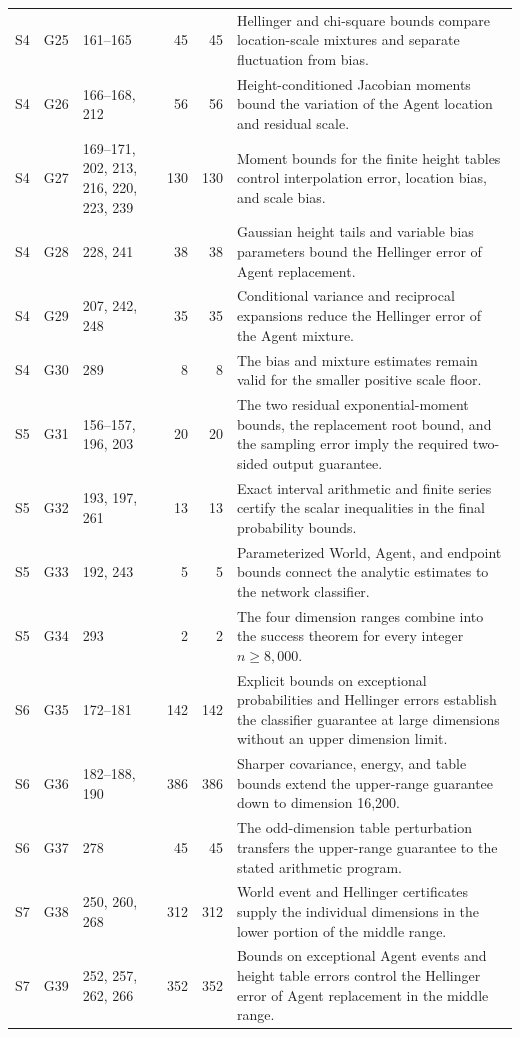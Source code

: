 \begin{longtable}{@{}l l p{} r r p{}@{}}
S4 & G25 & \raggedright 161--165 & 45 & 45 & \raggedright Hellinger and chi-square bounds compare location-scale mixtures and separate fluctuation from bias. \tabularnewline
S4 & G26 & \raggedright 166--168, 212 & 56 & 56 & \raggedright Height-conditioned Jacobian moments bound the variation of the Agent location and residual scale. \tabularnewline
S4 & G27 & \raggedright 169--171, 202, 213, 216, 220, 223, 239 & 130 & 130 & \raggedright Moment bounds for the finite height tables control interpolation error, location bias, and scale bias. \tabularnewline
S4 & G28 & \raggedright 228, 241 & 38 & 38 & \raggedright Gaussian height tails and variable bias parameters bound the Hellinger error of Agent replacement. \tabularnewline
S4 & G29 & \raggedright 207, 242, 248 & 35 & 35 & \raggedright Conditional variance and reciprocal expansions reduce the Hellinger error of the Agent mixture. \tabularnewline
S4 & G30 & \raggedright 289 & 8 & 8 & \raggedright The bias and mixture estimates remain valid for the smaller positive scale floor. \tabularnewline
S5 & G31 & \raggedright 156--157, 196, 203 & 20 & 20 & \raggedright The two residual exponential-moment bounds, the replacement root bound, and the sampling error imply the required two-sided output guarantee. \tabularnewline
S5 & G32 & \raggedright 193, 197, 261 & 13 & 13 & \raggedright Exact interval arithmetic and finite series certify the scalar inequalities in the final probability bounds. \tabularnewline
S5 & G33 & \raggedright 192, 243 & 5 & 5 & \raggedright Parameterized World, Agent, and endpoint bounds connect the analytic estimates to the network classifier. \tabularnewline
S5 & G34 & \raggedright 293 & 2 & 2 & \raggedright The four dimension ranges combine into the success theorem for every integer $n\ge8{,}000$. \tabularnewline
S6 & G35 & \raggedright 172--181 & 142 & 142 & \raggedright Explicit bounds on exceptional probabilities and Hellinger errors establish the classifier guarantee at large dimensions without an upper dimension limit. \tabularnewline
S6 & G36 & \raggedright 182--188, 190 & 386 & 386 & \raggedright Sharper covariance, energy, and table bounds extend the upper-range guarantee down to dimension 16{,}200. \tabularnewline
S6 & G37 & \raggedright 278 & 45 & 45 & \raggedright The odd-dimension table perturbation transfers the upper-range guarantee to the stated arithmetic program. \tabularnewline
S7 & G38 & \raggedright 250, 260, 268 & 312 & 312 & \raggedright World event and Hellinger certificates supply the individual dimensions in the lower portion of the middle range. \tabularnewline
S7 & G39 & \raggedright 252, 257, 262, 266 & 352 & 352 & \raggedright Bounds on exceptional Agent events and height table errors control the Hellinger error of Agent replacement in the middle range. \tabularnewline

\end{longtable}
